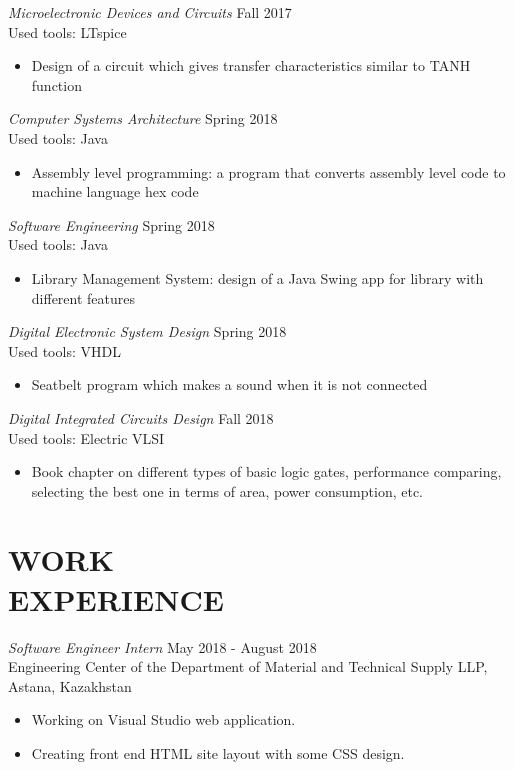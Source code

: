 \documentclass[margin, 10pt]{res} %
\begin{document}
\begin{resume}
{\sl Microelectronic Devices and Circuits} \hfill Fall 2017 \\
Used tools: LTspice
\begin{itemize}
\item Design of a circuit which gives transfer characteristics similar to TANH function 
\end{itemize} 

{\sl Computer Systems Architecture} \hfill Spring 2018 \\
Used tools: Java
\begin{itemize}
\item Assembly level programming: a program that converts assembly level code to machine language hex code
\end{itemize} 

{\sl Software Engineering} \hfill Spring 2018 \\
Used tools: Java
\begin{itemize}
\item Library Management System: design of a Java Swing app for library with different features
\end{itemize} 

{\sl Digital Electronic System Design} \hfill Spring 2018 \\
Used tools: VHDL
\begin{itemize}
\item Seatbelt program which makes a sound when it is not connected
\end{itemize} 

{\sl Digital Integrated Circuits Design} \hfill Fall 2018 \\
Used tools: Electric VLSI
\begin{itemize}
\item Book chapter on different types of basic logic gates, performance comparing, selecting the best one in terms of area, power consumption, etc.
\end{itemize} 

 \fi 
 
\section{WORK \\ EXPERIENCE}

{\sl Software Engineer Intern} \hfill May 2018 - August 2018 \\
Engineering Center of the Department of Material and Technical Supply LLP, Astana, Kazakhstan
\begin{itemize}
\item Working on Visual Studio web application.
\item Creating front end HTML site layout with some CSS design.
\end{itemize} 


\end{resume}
\end{document}

